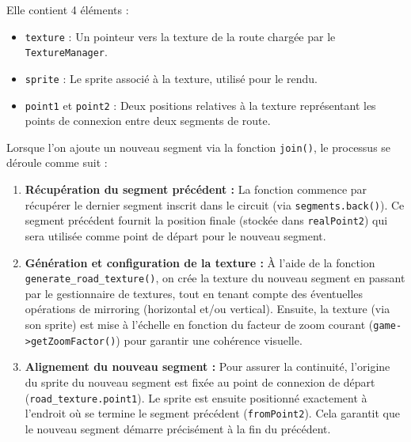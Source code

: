 Elle contient 4 éléments :
\begin{itemize}
    \item \texttt{texture} : Un pointeur vers la texture de la route chargée par le \texttt{TextureManager}.
    \item \texttt{sprite} : Le \gls{sprite} associé à la texture, utilisé pour le rendu.
    \item \texttt{point1} et \texttt{point2} : Deux positions relatives à la texture représentant les points de connexion entre deux segments de route.
\end{itemize}

Lorsque l'on ajoute un nouveau segment via la fonction \texttt{join()}, le processus se déroule comme suit :

\begin{enumerate}
    \item \textbf{Récupération du segment précédent :}
    La fonction commence par récupérer le dernier segment inscrit dans le circuit (via \texttt{segments.back()}).
    Ce segment précédent fournit la position finale (stockée dans \texttt{realPoint2}) qui sera utilisée comme point de départ pour le nouveau segment.

    \item \textbf{Génération et configuration de la texture :}
    À l'aide de la fonction \\\texttt{generate\_road\_texture()}, on crée la texture du nouveau segment en passant par le gestionnaire de textures, tout en tenant compte des éventuelles opérations de mirroring (horizontal et/ou vertical).
    Ensuite, la texture (via son \gls{sprite}) est mise à l’échelle en fonction du facteur de zoom courant (\texttt{game->getZoomFactor()}) pour garantir une cohérence visuelle.

    \item \textbf{Alignement du nouveau segment :}
    Pour assurer la continuité, l'origine du \gls{sprite} du nouveau segment est fixée au point de connexion de départ (\texttt{road\_texture.point1}).
    Le \gls{sprite} est ensuite positionné exactement à l'endroit où se termine le segment précédent (\texttt{fromPoint2}).
    Cela garantit que le nouveau segment démarre précisément à la fin du précédent.


\end{enumerate}
